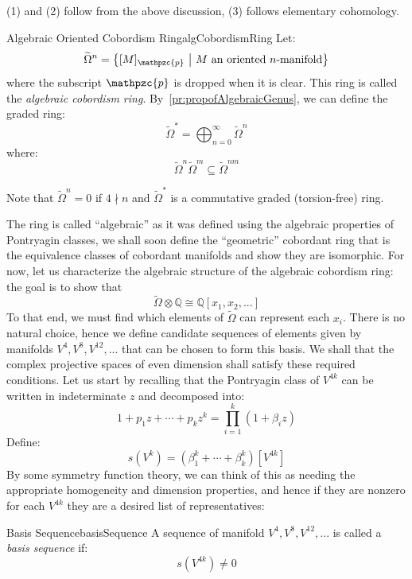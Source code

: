 \documentclass{book}
\newenvironment{Proof}[1][]
  {\begin{ProofTcb}[#1]}
  {\end{ProofTcb}}
\newcommand{\Q}{{\mathbb{Q}}}
\newcommand{\cp}{{\mathpzc{p}}}
\newcommand{\sse}{\subseteq}
\newcommand{\set}[2]{\left\{#1 \ \middle|\ #2\right\}}
\begin{document}
\begin{Proof}
  (1) and (2) follow from the above discussion, (3) follows elementary cohomology.
\end{Proof}


\begin{defn}{Algebraic Oriented Cobordism Ring}{algCobordismRing}
  Let:
  \[
    \widetilde{\Omega}^n = \set{[M]_\cp}{\text{$M$ an oriented $n$-manifold}}
  \]
  where the subscript $\cp$ is dropped when it is clear. This ring is called the \emph{algebraic cobordism
  ring}. By~\cref{pr:propofAlgebraicGenus}, we can define the
  graded ring:
  \[
    \widetilde{\Omega}^* = \bigoplus_{n=0}^\infty \widetilde{\Omega}^n
  \]
  where:
  \[
    \widetilde{\Omega}^n \widetilde{\Omega}^m \sse \widetilde{\Omega}^{nm}
  \]
\end{defn}

Note that $\widetilde{\Omega}^n = 0$ if $4\nmid n$ and $\widetilde{\Omega}^*$ is a commutative graded (torsion-free)
ring.

The ring is called ``algebraic'' as it was defined using the algebraic properties of Pontryagin classes, we
shall soon define the ``geometric'' cobordant ring that is the equivalence classes of cobordant manifolds and
show they are isomorphic. For now, let us characterize the algebraic structure of the algebraic cobordism
ring: the goal is to show that
\[
  \widetilde{\Omega}\otimes \Q \cong \Q[x_1, x_2, ...]
\]
To that end, we must find which elements of $\widetilde{\Omega}$ can represent each $x_i$. There is no natural
choice, hence we define candidate sequences of elements given by manifolds $V^4, V^8, V^{12}, ...$ that
can be chosen to form this basis. We shall that the complex projective spaces of even
dimension shall satisfy these required conditions. Let us start by recalling that the Pontryagin class of $V^{4k}$ can be written in indeterminate $z$
and decomposed into:
\[
  1 + p_1z + \cdots + p_kz^k = \prod_{i=1}^k (1 + \beta_iz)
\]
Define:
\[
  s(V^k) = (\beta_1^k + \cdots + \beta_k^k)[V^{4k}]
\]
By some symmetry function theory, we can think of this as needing the appropriate homogeneity and dimension
properties, and hence if they are nonzero for each $V^{4k}$ they are a desired list of representatives:
\begin{defn}{Basis Sequence}{basisSequence}
  A sequence of manifold $V^4, V^8, V^{12}, ...$ is called a \emph{basis sequence} if:
  \[
    s(V^{4k}) \ne 0
  \]
\end{defn}
\end{document}
